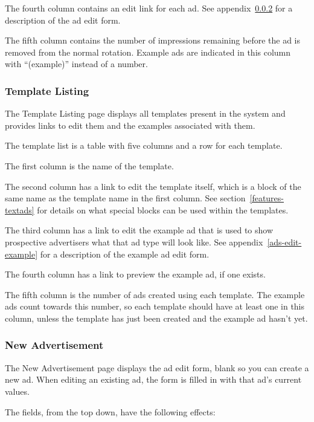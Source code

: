 The fourth column contains an edit link for each ad.  See appendix~\ref{ads-new-ad} for a description of the ad edit form.

The fifth column contains the number of impressions remaining before the ad is removed from the normal rotation.  Example ads are indicated in this column with ``(example)'' instead of a number.

\subsubsection{Template Listing}

The Template Listing page displays all templates present in the system and provides links to edit them and the examples associated with them.

The template list is a table with five columns and a row for each template.

The first column is the name of the template.

The second column has a link to edit the template itself, which is a block of the same name as the template name in the first column.  See section~\ref{features-textads} for details on what special blocks can be used within the templates.

The third column has a link to edit the example ad that is used to show prospective advertisers what that ad type will look like.  See appendix~\ref{ads-edit-example} for a description of the example ad edit form.

The fourth column has a link to preview the example ad, if one exists.

The fifth column is the number of ads created using each template.  The example ads count towards this number, so each template should have at least one in this column, unless the template has just been created and the example ad hasn't yet.

\subsubsection{New Advertisement}
\label{ads-new-ad}

The New Advertisement page displays the ad edit form, blank so you can create a new ad.  When editing an existing ad, the form is filled in with that ad's current values.

The fields, from the top down, have the following effects:

